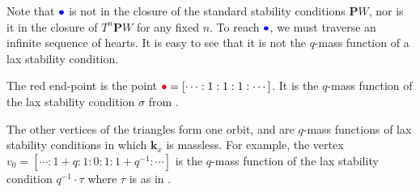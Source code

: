 \documentclass{amsart}
\begin{document}
Note that \(\textcolor{blue}{\bullet}\) is not in the closure of the standard stability conditions \(\mathbf{P}W\), nor is it in the closure of \(T^n \mathbf{P}W\) for any fixed \(n\).
To reach \(\textcolor{blue}{\bullet}\), we must traverse an infinite sequence of hearts.
It is easy to see that it is not the \(q\)-mass function of a lax stability condition.

The red end-point is the point \(\textcolor{red}{\bullet} = [\cdots : 1 : 1 : 1 : \cdots]\).
It is the \(q\)-mass function of the lax stability condition \(\sigma\) from .

The other vertices of the triangles form one orbit, and are \(q\)-mass functions of lax stability conditions in which \(\mathbf{k}_x\) is massless.
For example, the vertex \(v_0 = [ \cdots: 1+q : 1 : 0 : 1 : 1+q^{-1} : \cdots ]\) is the \(q\)-mass function of the lax stability condition \(q^{-1} \cdot \tau\) where \(\tau\) is as in .




\end{document}
